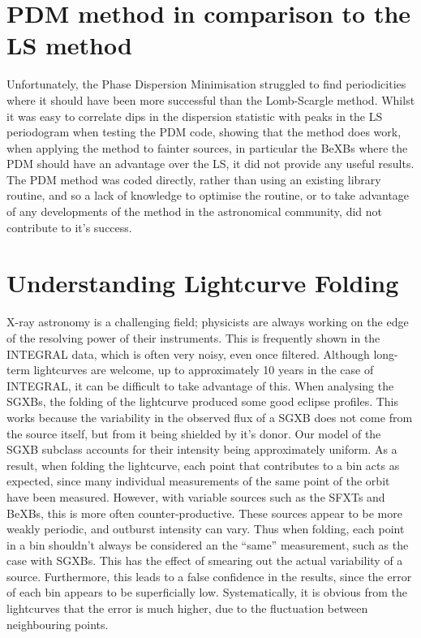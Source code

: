 \section{PDM method in comparison to the LS method}
Unfortunately, the Phase Dispersion Minimisation struggled to find periodicities where it should have been more successful than the Lomb-Scargle method. Whilst it was easy to correlate dips in the dispersion statistic with peaks in the LS periodogram when testing the PDM code, showing that the method does work, when applying the method to fainter sources, in particular the BeXBs where the PDM should have an advantage over the LS, it did not provide any useful results. The PDM method was coded directly, rather than using an existing library routine, and so a lack of knowledge to optimise the routine, or to take advantage of any developments of the method in the astronomical community, did not contribute to it\textquoteright{}s success.

\section{Understanding Lightcurve Folding}
X-ray astronomy is a challenging field; physicists are always working on the edge of the resolving power of their instruments. This is frequently shown in the INTEGRAL data, which is often very noisy, even once filtered. Although long-term lightcurves are welcome, up to approximately 10 years in the case of INTEGRAL, it can be difficult to take advantage of this. When analysing the SGXBs, the folding of the lightcurve produced some good eclipse profiles. This works because the variability in the observed flux of a SGXB does not come from the source itself, but from it being shielded by it's donor. Our model of the SGXB subclass accounts for their intensity being approximately uniform. As a result, when folding the lightcurve, each point that contributes to a bin acts as expected, since many individual measurements of the same point of the orbit have been measured. However, with variable sources such as the SFXTs and BeXBs, this is more often counter-productive. These sources appear to be more weakly periodic, and outburst intensity can vary. Thus when folding, each point in a bin shouldn't always be considered an the \textquotedblleft{}same\textquotedblright{} measurement, such as the case with SGXBs. This has the effect of smearing out the actual variability of a source. Furthermore, this leads to a false confidence in the results, since the error of each bin appears to be superficially low. Systematically, it is obvious from the lightcurves that the error is much higher, due to the fluctuation between neighbouring points. 

